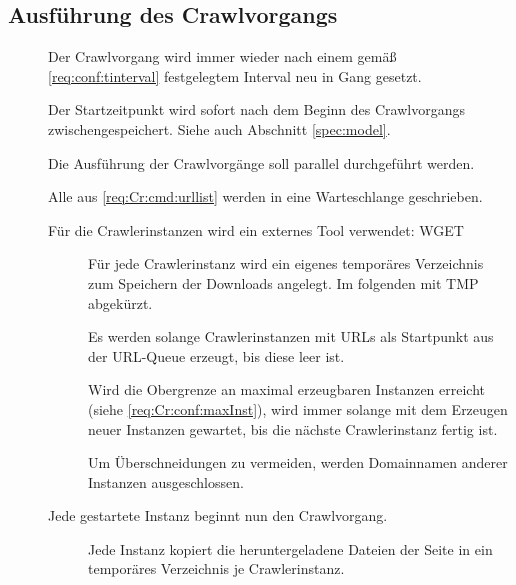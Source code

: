 \subsection{Ausführung des Crawlvorgangs} \label{spec:crawler:exec}
\begin{description}
	\item []
		Der Crawlvorgang wird immer wieder nach einem gemäß \ref{req:conf:tinterval} festgelegtem
		Interval neu in Gang gesetzt. 
	\item []
		Der Startzeitpunkt wird sofort nach dem Beginn des Crawlvorgangs zwischengespeichert.
		Siehe auch Abschnitt \ref{spec:model}.
	\item []
		Die Ausführung der Crawlvorgänge soll parallel durchgeführt werden.
	\item []
		Alle aus \ref{req:Cr:cmd:urllist} werden in eine Warteschlange geschrieben.
	\item []
				Für die Crawlerinstanzen wird ein externes Tool verwendet: WGET
		\begin{description}
			\item []
				Für jede Crawlerinstanz wird ein eigenes temporäres Verzeichnis zum Speichern
				der Downloads angelegt. Im folgenden mit TMP abgekürzt.
			\item []
				Es werden solange Crawlerinstanzen mit URLs als Startpunkt aus der URL-Queue erzeugt,
				bis diese leer ist. 
			\item []
				Wird die Obergrenze an maximal erzeugbaren Instanzen erreicht 
				(siehe \ref{req:Cr:conf:maxInst}),
				wird immer solange mit dem Erzeugen neuer Instanzen gewartet,
				bis die nächste	Crawlerinstanz fertig ist.
			\item []
				Um Überschneidungen zu vermeiden, werden Domainnamen anderer Instanzen ausgeschlossen.
		\end{description}
	\item []
		Jede gestartete Instanz beginnt nun den Crawlvorgang.
		\begin{description}
			\item []
				Jede Instanz kopiert die heruntergeladene Dateien 
				der Seite in ein temporäres Verzeichnis je Crawlerinstanz.

\end{description}
\end{description}
